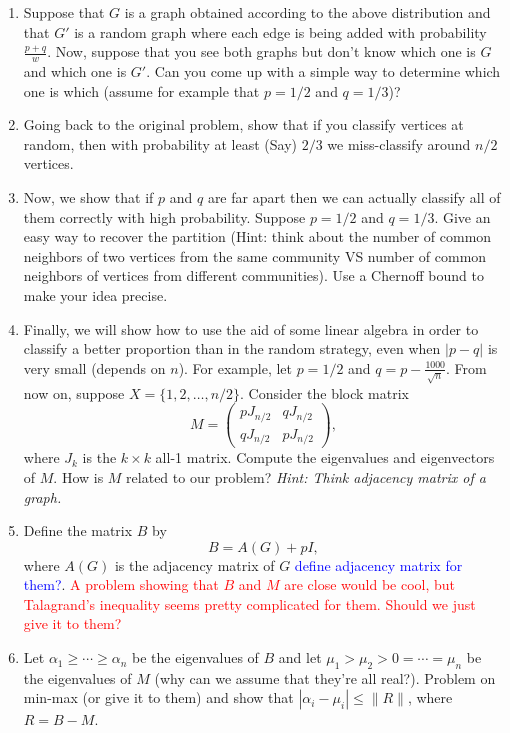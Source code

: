 \documentclass[11pt,letterpaper]{article}
\begin{document}
\begin{enumerate}[a]
    \item Suppose that $G$ is a graph obtained according to the above distribution and that $G'$ is a random graph where each edge is being added with probability $\frac{p+q}{w}$. Now, suppose that you see both graphs but don't know which one is $G$ and which one is $G'$. Can you come up with a simple way to determine which one is which (assume for example that $p=1/2$ and $q=1/3$)? 
    \item Going back to the original problem, show that if you classify vertices at random, then with probability at least (Say) $2/3$ we miss-classify around $n/2$ vertices. 
    
	\item Now, we show that if $p$ and $q$ are far apart then we can actually classify all of them correctly with high probability. Suppose $p = 1/2$ and $q=1/3$. Give an easy way to recover the partition (Hint: think about the number of common neighbors of two vertices from the same community VS number of common neighbors of vertices from different communities). Use a Chernoff bound to make your idea precise.

	\item Finally, we will show how to use the aid of some linear algebra in order to classify a better proportion than in the random strategy, even when $|p-q|$ is very small (depends on $n$). For example, let $p = 1/2$ and $q = p-\frac{1000}{\sqrt{n}}$. From now on, suppose $X = \{1, 2, \ldots, n/2\}$. Consider the block matrix
	\[
	M = \begin{pmatrix}
		pJ_{n/2} & qJ_{n/2}\\
		qJ_{n/2} & pJ_{n/2}
	\end{pmatrix},
	\]
	where $J_k$ is the $k\times k$ all-1 matrix. Compute the eigenvalues and eigenvectors of $M$. How is $M$ related to our problem? \textit{Hint: Think adjacency matrix of a graph.}

	\item Define the matrix $B$ by
	\[
	B = A(G) + pI,
	\]
	where $A(G)$ is the adjacency matrix of $G$ \textcolor{blue}{define adjacency matrix for them?}. \textcolor{red}{A problem showing that $B$ and $M$ are close would be cool, but Talagrand's inequality seems pretty complicated for them. Should we just give it to them?}

	\item Let $\alpha_1 \geq \cdots \geq \alpha_n$ be the eigenvalues of $B$ and let $\mu_1 > \mu_2 > 0 = \cdots = \mu_n$ be the eigenvalues of $M$ (why can we assume that they're all real?). Problem on min-max (or give it to them) and show that $|\alpha_i - \mu_i| \leq \|R\|$, where $R = B-M$.


\end{enumerate}
\end{document}
